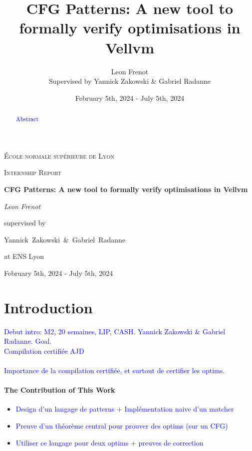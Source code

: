\documentclass[11pt]{article}
\newcommand{\leon}[1]{\textcolor{blue}{#1}}
\begin{document}
\title{CFG Patterns: A new tool to formally verify optimisations in Vellvm}

\author{Leon Frenot\\ Supervised by Yannick Zakowski \& Gabriel Radanne}

\date{February 5th, 2024 - July 5th, 2024}

\begin{titlepage}
  \centering
  {\textsc{École normale supérieure de Lyon} \par}
  \vspace{1cm}
  {\Large \textsc{Internship Report}\par}
  \vspace{1.5cm}
  {\huge\bfseries CFG Patterns: A new tool to formally verify optimisations in Vellvm\par}
  \vspace{2cm}
  {\Large\itshape Leon Frenot\par}
  \vfill
  supervised by\par
  Yannick~Zakowski~\&~Gabriel~Radanne\par
  at ENS Lyon
  \vfill

  {\large February 5th, 2024 - July 5th, 2024\par}
\end{titlepage}

\tableofcontents
\newpage

\hypersetup{colorlinks=true, linkcolor=red}

\begin{abstract}
  \leon{Abstract}
\end{abstract}

\section{Introduction}
\label{sec:intro}

\indent
\leon{Debut intro: M2, 20 semaines, LIP, CASH. Yannick Zakowski \& Gabriel Radanne. Goal.}\\

\leon{Compilation certifiée AJD}

\paragraph{}
\leon{Importance de la compilation certifiée, et surtout de certifier les optims.}

\paragraph{The Contribution of This Work}
\begin{itemize}
  \item \leon{Design d'un langage de patterns + Implémentation naive d'un matcher}
  \item \leon{Preuve d'un théorème central pour prouver des optims (sur un CFG)}
  \item \leon{Utiliser ce langage pour deux optims + preuves de correction}
\end{itemize}
\end{document}
